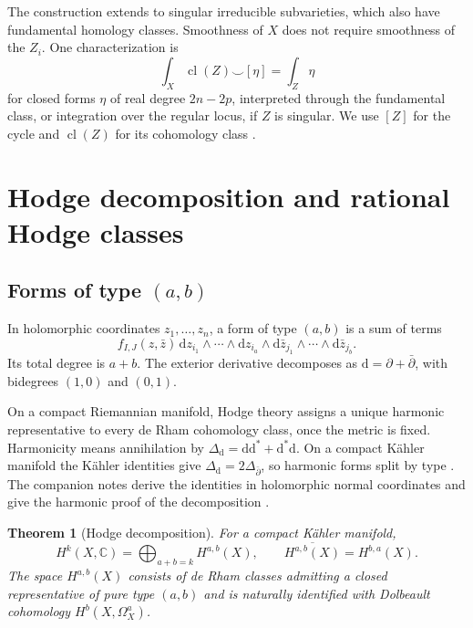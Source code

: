 \documentclass[11pt,reqno]{amsart}
\newtheorem{theorem}{Theorem}[section]
\theoremstyle{definition}
\theoremstyle{remark}
\numberwithin{equation}{section}
\newcommand{\C}{\mathbb{C}}
\newcommand{\dd}{\mathrm{d}}
\newcommand{\dbar}{\bar\partial}
\DeclareMathOperator{\cl}{cl}
\begin{document}
The construction extends to singular irreducible subvarieties, which also
have fundamental homology classes. Smoothness of $X$ does not require
smoothness of the $Z_i$. One characterization is
\begin{equation}\label{eq:integration}
 \int_X \cl(Z)\smile[\eta]=\int_Z\eta
\end{equation}
for closed forms $\eta$ of real degree $2n-2p$, interpreted through the
fundamental class, or integration over the regular locus, if $Z$ is singular.
We use $[Z]$ for the cycle and $\cl(Z)$ for its cohomology class \cite{fulton1998,voisin2003hodge2}.

\section{Hodge decomposition and rational Hodge classes}\label{sec:hodge}

\subsection{Forms of type \texorpdfstring{$(a,b)$}{(a,b)}}

In holomorphic coordinates $z_1,\ldots,z_n$, a form of type $(a,b)$ is a sum
of terms
\[
 f_{I,J}(z,\bar z)\,
 \dd z_{i_1}\wedge\cdots\wedge\dd z_{i_a}
 \wedge\dd\bar z_{j_1}\wedge\cdots\wedge\dd\bar z_{j_b}.
\]
Its total degree is $a+b$. The exterior derivative decomposes as
$\dd=\partial+\dbar$, with bidegrees $(1,0)$ and $(0,1)$.

On a compact Riemannian manifold, Hodge theory assigns a unique harmonic
representative to every de Rham cohomology class, once the metric is fixed.
Harmonicity means annihilation by
$\Delta_{\dd}=\dd\dd^*+\dd^*\dd$. On a compact K\"ahler manifold the
K\"ahler identities give $\Delta_{\dd}=2\Delta_{\dbar}$, so harmonic forms
split by type \cite{voisin2002hodge}. The companion notes derive the identities in
holomorphic normal coordinates and give the harmonic proof of the
decomposition \cite[\S\S5--6]{gaganotes}.

\begin{theorem}[Hodge decomposition]
For a compact K\"ahler manifold,
\begin{equation}\label{eq:decomposition}
 H^k(X,\C)=\bigoplus_{a+b=k}H^{a,b}(X),
 \qquad \overline{H^{a,b}(X)}=H^{b,a}(X).
\end{equation}
The space $H^{a,b}(X)$ consists of de Rham classes admitting a closed
representative of pure type $(a,b)$ and is naturally identified with
Dolbeault cohomology $H^b(X,\Omega_X^a)$.
\end{theorem}
\end{document}
